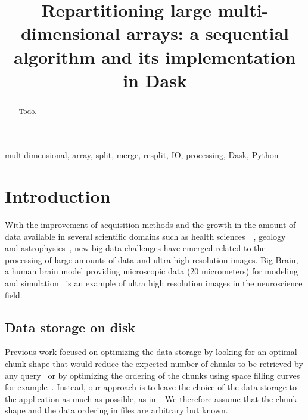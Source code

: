 \documentclass[conference]{IEEEtran}
\begin{document}
\title{Repartitioning large multi-dimensional arrays: a sequential algorithm and its implementation in Dask}

\author{
}

\maketitle

\begin{abstract}
Todo.
\end{abstract}

\begin{IEEEkeywords}
multidimensional, array, split, merge, resplit, IO, processing, Dask, Python
\end{IEEEkeywords}

\section{Introduction}
With the improvement of acquisition methods and the growth in the amount of data
available in several scientific domains such as health
sciences~\cite{bigdata_health}~\cite{Amunts1472}, geology~\cite{big_data_geology}
and astrophysics~\cite{biguniverse}, new big data challenges have emerged related
to the processing of large amounts of data and ultra-high resolution
images. Big Brain, a human brain model providing microscopic data (20 micrometers) for
modeling and simulation~\cite{Amunts1472} is an example of ultra high resolution
images in the neuroscience field.

\subsection{Data storage on disk}
Previous work focused on optimizing the data storage by looking for an optimal
chunk shape that would reduce the expected number of chunks to be retrieved by
any query~\cite{optimal_chuking} or by optimizing the ordering of the chunks
using space filling curves for example~\cite{optimal_chuking, openconnectomecluster}.
Instead, our approach is to leave the choice of the
data storage to the application as much as possible, as in~\cite{seqalgorithms}.
We therefore assume that
the chunk shape and the data ordering in files are arbitrary but known.
\end{document}
